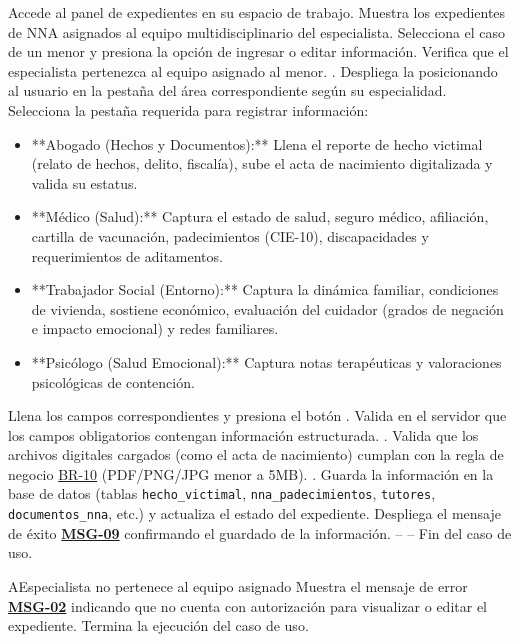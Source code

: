 \begin{UCtrayectoria}
	\UCpaso[\UCactor] Accede al panel de expedientes en su espacio de trabajo.
	\UCpaso Muestra los expedientes de NNA asignados al equipo multidisciplinario del especialista.
	\UCpaso[\UCactor] Selecciona el caso de un menor y presiona la opción de ingresar o editar información.
	\UCpaso Verifica que el especialista pertenezca al equipo asignado al menor. .
	\UCpaso Despliega la  posicionando al usuario en la pestaña del área correspondiente según su especialidad.
	\UCpaso[\UCactor] Selecciona la pestaña requerida para registrar información:
		\begin{itemize}
			\item **Abogado (Hechos y Documentos):** Llena el reporte de hecho victimal (relato de hechos, delito, fiscalía), sube el acta de nacimiento digitalizada y valida su estatus.
			\item **Médico (Salud):** Captura el estado de salud, seguro médico, afiliación, cartilla de vacunación, padecimientos (CIE-10), discapacidades y requerimientos de aditamentos.
			\item **Trabajador Social (Entorno):** Captura la dinámica familiar, condiciones de vivienda, sostiene económico, evaluación del cuidador (grados de negación e impacto emocional) y redes familiares.
			\item **Psicólogo (Salud Emocional):** Captura notas terapéuticas y valoraciones psicológicas de contención.
		\end{itemize}
	\UCpaso[\UCactor] Llena los campos correspondientes y presiona el botón .
	\UCpaso Valida en el servidor que los campos obligatorios contengan información estructurada. .
	\UCpaso Valida que los archivos digitales cargados (como el acta de nacimiento) cumplan con la regla de negocio \hyperlink{BR-10}{BR-10} (PDF/PNG/JPG menor a 5MB). .
	\UCpaso Guarda la información en la base de datos (tablas \texttt{hecho\_victimal}, \texttt{nna\_padecimientos}, \texttt{tutores}, \texttt{documentos\_nna}, etc.) y actualiza el estado del expediente.
	\UCpaso Despliega el mensaje de éxito \hyperlink{mMSG09}{\bf MSG-09} confirmando el guardado de la información.
	\UCpaso[] -- -- Fin del caso de uso.
\end{UCtrayectoria}

\begin{UCtrayectoriaA}{A}{Especialista no pertenece al equipo asignado}
	\UCpaso Muestra el mensaje de error \hyperlink{mMSG02}{\bf MSG-02} indicando que no cuenta con autorización para visualizar o editar el expediente.
	\UCpaso Termina la ejecución del caso de uso.
\end{UCtrayectoriaA}


